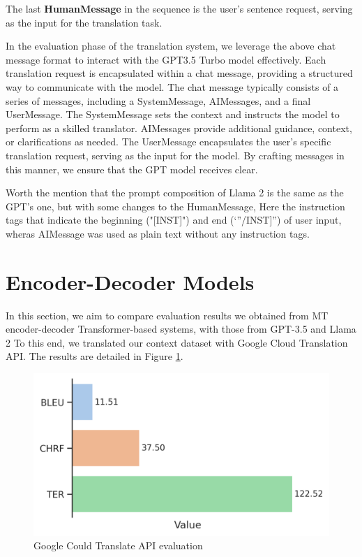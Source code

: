\documentclass[twocolumn]{article}
\begin{document}
The last \textbf{HumanMessage} in the sequence is the user’s sentence request, serving as the input for the translation task.


In the evaluation phase of the translation system, we leverage the above chat message format to interact with the GPT3.5 Turbo model effectively. Each translation request is encapsulated within a chat message, providing a structured way to communicate with the model. The chat message typically consists of a series of messages, including a SystemMessage, AIMessages, and a final UserMessage. The SystemMessage sets the context and instructs the model to perform as a skilled translator. AIMessages provide additional guidance, context, or clarifications as needed. The UserMessage encapsulates the user’s specific translation request, serving as the input for the model. By crafting messages in this manner, we ensure that the GPT model receives clear.

Worth the mention that the prompt composition of Llama 2 is the same as the GPT's one, but with some changes to the HumanMessage, Here the instruction tags that indicate the beginning ("[INST]") and end (`”/INST]”) of user input, wheras AIMessage was used as plain text without any instruction tags.


\section{Encoder-Decoder Models}
In this section, we aim to compare evaluation
results we obtained from MT encoder-decoder Transformer-based systems\cite{vaswani2017attention}, with those from GPT-3.5 and Llama 2 To this end, we translated our context dataset with Google Cloud Translation API. The results are detailed in Figure \ref{fig:google_transltation_evaluation}.

\begin{figure}
\centering
\includegraphics[width=\linewidth, ]{figs/Google_translate_api} %
\caption{ Google Could Translate API evaluation}

\label{fig:google_transltation_evaluation}
\end{figure}
\end{document}
